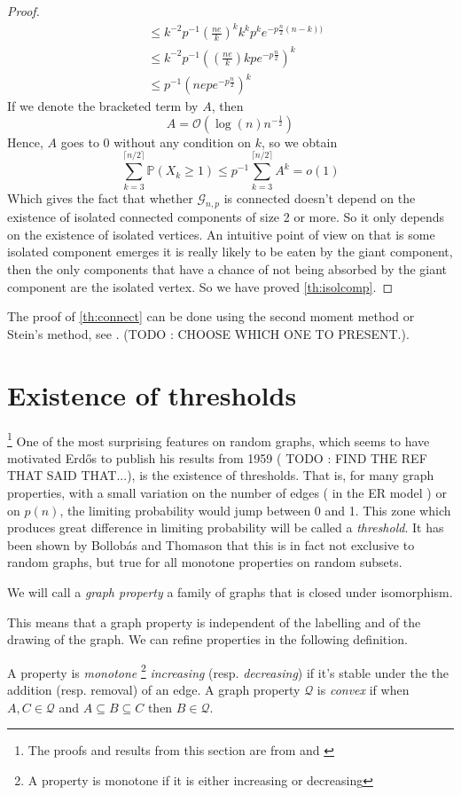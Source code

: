 \begin{proof}
\begin{align}
	            &\leq k^{-2}p^{-1}(\frac{ne}{k})^k k^{k} p^{k} e^{-p\frac{n}{2}(n-k))}\\
	            &\leq k^{-2}p^{-1}((\frac{ne}{k}) k p e^{-p\frac{n}{2}})^k\\
	            &\leq p^{-1}(nep e^{-p\frac{n}{2}})^k
\end{align}
If we denote the bracketed term by $A$, then
\begin{equation}
    A = \mathcal{O}(\log(n) n^{-\frac{1}{2}})
\end{equation}
Hence, $A$ goes to 0 without any condition on $k$, so we obtain
\begin{equation}
    \sum_{k=3}^{\lceil n/2\rceil} \mathbb{P}(X_k \geq 1)\leq p^{-1}\sum_{k=3}^{\lceil n/2\rceil} A^k = o(1)
\end{equation}
Which gives the fact that whether $\mathcal{G}_{n,p}$ is connected doesn't depend on the existence of isolated connected components of size 2 or more. So it only depends on the existence of isolated vertices.
An intuitive point of view on that is some isolated component emerges it is really likely to be eaten by the giant component, then the only components that have a chance of not being absorbed by the giant component are the isolated vertex.
So we have proved \ref{th:isolcomp}.
\end{proof}
The proof of \ref{th:connect} can be done using the second moment method or Stein's method, see \cite{JLR}. (TODO : CHOOSE WHICH ONE TO PRESENT.).
\section{Existence of thresholds}\footnote{ The proofs and results from this section are from \cite{JLR} and \cite{Bollob01}}
One of the most surprising features on random graphs, which seems to have motivated Erd\H{o}s to publish his results from 1959 ( TODO : FIND THE REF THAT SAID THAT...), is the existence of thresholds. That is, for many graph properties, with a small variation on the number of edges ( in the ER model ) or on $p(n)$, the limiting probability would jump between 0 and 1.
This zone which produces great difference in limiting probability will be called a \emph{threshold}.
It has been shown by Bollob\'as and Thomason \cite{Bollob87} that this is in fact not exclusive to random graphs, but true for all monotone properties on random subsets.
\begin{definition}
	We will call a \emph{graph property} a family of graphs that is closed under isomorphism.
\end{definition}
This means that a graph property is independent of the labelling and of the drawing of the graph.
We can refine properties in the following definition.
\begin{definition}
	A property is \emph{monotone }\footnote{ A property is monotone if it is either increasing or decreasing} \emph{increasing} (resp. \emph{decreasing}) if it's stable under the the addition (resp. removal) of an edge.
	A graph property $\mathcal{Q}$ is \emph{convex} if when $ A,C \in \mathcal{Q}$ and $A\subseteq B\subseteq C$ then $B \in \mathcal{Q}$. 
\end{definition}

